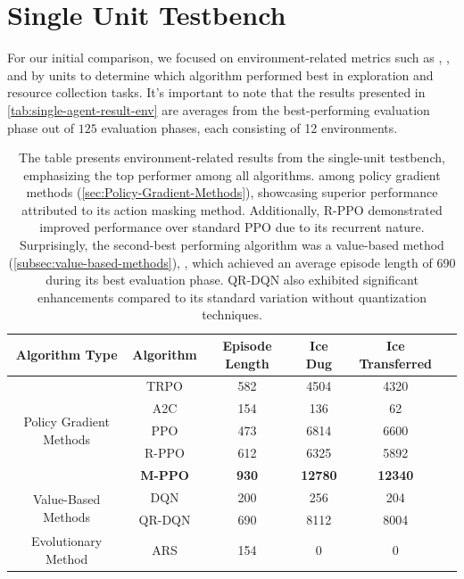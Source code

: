 \section{Single Unit Testbench}
\label{sec:single-unit-testbench-results}

\noindent For our initial comparison, we focused on environment-related metrics such as , , and  by units to determine which algorithm performed best in exploration and resource collection tasks. It's important to note that the results presented in \textcolor{deepblue}{\autoref{tab:single-agent-result-env}} are averages from the best-performing evaluation phase out of $125$ evaluation phases, each consisting of 12 environments.

\bigskip

\begin{table}[htbp]
    \centering
    \begin{tabular}{|c|c|c|c|c|c|}
        \hline
        \textbf{Algorithm Type} & \textbf{Algorithm} & \textbf{Episode Length} & \textbf{Ice Dug} & \textbf{Ice Transferred}\\
        \hline
        \multirow{5}{*}{Policy Gradient Methods} & TRPO  & 582  &  4504  & 4320 \\
        \cline{2-5}
         & A2C & 154 &  136  &  62\\
        \cline{2-5}
         & PPO & 473  & 6814  & 6600 \\
        \cline{2-5}
         & R-P\textbf{}PO  & 612 & 6325  & 5892\\
        \cline{2-5}
         & \textbf{M-PPO}  & \textbf{930} &  \textbf{12780} &  \textbf{12340}\\
        \hline
        \multirow{2}{*}{Value-Based Methods} & DQN & 200  & 256  &  204\\
        \cline{2-5}
         & QR-DQN & 690  &  8112 &  8004 \\
        \hline
        Evolutionary Method & ARS & 154 &  0 &  0\\
        \hline
    \end{tabular}
    \captionsetup{justification=justified, singlelinecheck=false, width=1\linewidth, labelfont=bf} 
    \caption{The table presents environment-related results from the single-unit testbench, emphasizing the top performer among all algorithms.  among policy gradient methods (\autoref{sec:Policy-Gradient-Methods}), showcasing superior performance attributed to its action masking method. Additionally, R-PPO demonstrated improved performance over standard PPO due to its recurrent nature. Surprisingly, the second-best performing algorithm was a value-based method (\autoref{subsec:value-based-methods}), , which achieved an average episode length of 690 during its best evaluation phase. QR-DQN also exhibited significant enhancements compared to its standard variation without quantization techniques.}
    \label{tab:single-agent-result-env}
\end{table}

